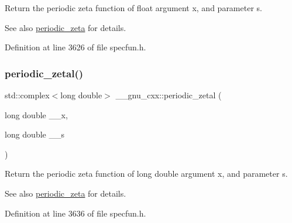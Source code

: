 Return the periodic zeta function of {\ttfamily float} argument {\ttfamily x}, and parameter {\ttfamily s}.

\begin{DoxySeeAlso}{See also}
\hyperlink{group__mathsf__gnu_ga06b06216e87b868cb21c76d33ac560c8}{periodic\+\_\+zeta} for details. 
\end{DoxySeeAlso}


Definition at line 3626 of file specfun.\+h.

\mbox{\label{group__mathsf__gnu_gab7573fb57ebaabac4432bb5e6b525151}} 
\subsubsection{\texorpdfstring{periodic\+\_\+zetal()}{periodic\_zetal()}}
{\footnotesize\ttfamily std\+::complex$<$long double$>$ \+\_\+\+\_\+gnu\+\_\+cxx\+::periodic\+\_\+zetal (\begin{DoxyParamCaption}\item[{long double}]{\+\_\+\+\_\+x,  }\item[{long double}]{\+\_\+\+\_\+s }\end{DoxyParamCaption})\hspace{0.3cm}{\ttfamily [inline]}}

Return the periodic zeta function of {\ttfamily long double} argument {\ttfamily x}, and parameter {\ttfamily s}.

\begin{DoxySeeAlso}{See also}
\hyperlink{group__mathsf__gnu_ga06b06216e87b868cb21c76d33ac560c8}{periodic\+\_\+zeta} for details. 
\end{DoxySeeAlso}


Definition at line 3636 of file specfun.\+h.

\mbox{\label{group__mathsf__gnu_ga65e674e7fe1457e819897e0d608c18b8}} 
